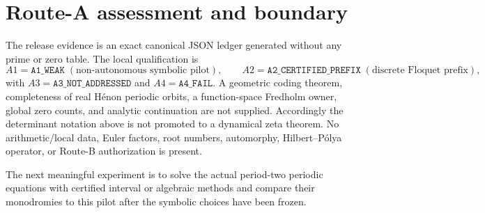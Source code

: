 \documentclass[10pt]{article}
\begin{document}
\section{Route-A assessment and boundary}
The release evidence is an exact canonical JSON ledger generated without any
prime or zero table.  The local qualification is
\[
 A1=\texttt{A1\_WEAK}\;(\text{non-autonomous symbolic pilot}),\qquad
 A2=\texttt{A2\_CERTIFIED\_PREFIX}\;(\text{discrete Floquet prefix}),
\]
with $A3=\texttt{A3\_NOT\_ADDRESSED}$ and $A4=\texttt{A4\_FAIL}$.  A geometric
coding theorem, completeness of real H\'enon periodic orbits, a function-space
Fredholm owner, global zero counts, and analytic continuation are not supplied.
Accordingly the determinant notation above is not promoted to a dynamical
zeta theorem.  No arithmetic/local data, Euler factors, root numbers,
automorphy, Hilbert--P\'olya operator, or Route-B authorization is present.

The next meaningful experiment is to solve the actual period-two periodic
equations with certified interval or algebraic methods and compare their
monodromies to this pilot after the symbolic choices have been frozen.
\end{document}
